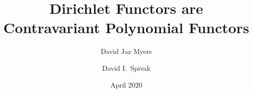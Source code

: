 \documentclass[11pt]{article}
\title{Dirichlet Functors are Contravariant Polynomial Functors}
\author{David Jaz Myers \and David I.\ Spivak}
\date{April 2020}
\begin{document}
\maketitle

\begin{abstract}

\end{abstract}


\end{document}
